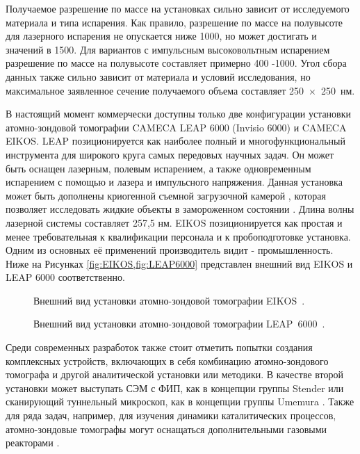 Получаемое разрешение по массе на установках сильно зависит от исследуемого материала и типа испарения. Как правило, разрешение по массе на полувысоте для лазерного испарения не опускается ниже 1000, но может достигать и значений в 1500. Для вариантов с импульсным высоковольтным  испарением разрешение по массе на полувысоте составляет примерно 400 -1000. Угол сбора данных также сильно зависит от материала и условий исследования, но максимальное заявленное сечение получаемого объема составляет 250~×~250~нм.

В настоящий момент коммерчески доступны только две конфигурации установки атомно-зондовой томографии CAMECA LEAP 6000 (Invisio 6000) и CAMECA EIKOS. LEAP позиционируется как наиболее полный и многофункциональный инструмента для широкого круга самых передовых научных задач. Он может быть оснащен лазерным, полевым испарением, а также одновременным испарением с помощью и лазера и импульсного напряжения. Данная установка может быть дополнены криогенной съемной загрузочной камерой \cite{Stender20}, которая позволяет исследовать жидкие объекты в замороженном состоянии \cite{Schwarz20}. Длина волны лазерной системы составляет 257,5 нм. EIKOS  позиционируется как простая и менее требовательная к квалификации персонала и к пробоподготовке установка. Одним из основных её применений производитель видит - промышленность. Ниже на Рисунках \cref{fig:EIKOS,fig:LEAP6000} представлен внешний вид EIKOS и LEAP 6000 соответственно.

\begin{figure}[htb]
	\caption{Внешний вид установки атомно-зондовой томографии EIKOS~\cite{EIKOS}.}
	\label{fig:EIKOS}
\end{figure}

\begin{figure}[htb]
	\caption{Внешний вид установки атомно-зондовой томографии LEAP~6000~\cite{LEAP6000}.}
	\label{fig:LEAP6000}
\end{figure}

\FloatBarrier

Среди современных разработок также стоит отметить попытки создания комплексных устройств, включающих в себя комбинацию атомно-зондового томографа и другой аналитической установки или методики. В качестве второй установки может выступать СЭМ с ФИП, как в концепции группы Stender \cite{Stender22} или сканирующий туннельный микроскоп, как в концепции группы Umemura \cite{Umemura19}. Также для ряда задач, например, для изучения динамики каталитических процессов, атомно-зондовые томографы могут оснащаться дополнительными газовыми реакторами \cite{Lambeets20}.

